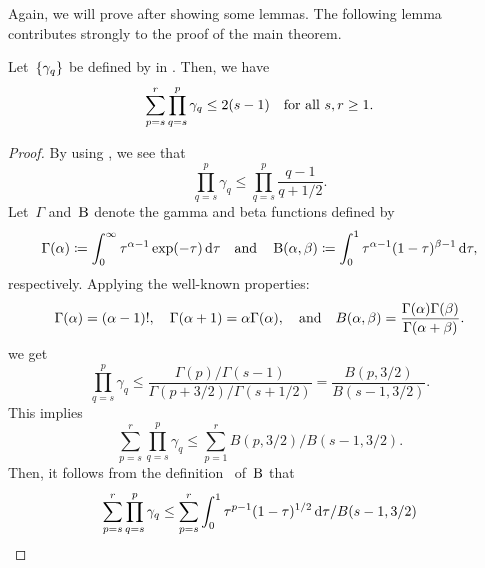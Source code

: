 \documentclass[../main]{subfiles}
\begin{document}
Again, we will prove  after showing some lemmas.
The following lemma contributes strongly to the proof of the main theorem.
\begin{lemma} 
    Let~$\set*{\gamma_q}$ be defined by  in .
    Then, we have
    \begin{equation}
        \sum_{p = s}^r \prod_{q = s}^p \gamma_q \le 2 ( s - 1) \forallcondition{s, r \ge 1}
        .\end{equation}
\end{lemma}
\begin{proof}
    By using , we see that
    \begin{equation}
        \prod_{q = s}^{p} \gamma_q \le \prod_{q = s}^{p} \frac{q - 1}{q + 1 / 2}
        .\end{equation}
    Let~$\Gamma$ and~$\Beta$ denote the gamma and beta functions defined by
    \begin{equation} \label{eq:gamma and beta}
        \Gamma(\alpha) \coloneqq \int_{0}^{\infty} \tau^{\alpha - 1} \exp(-\tau) \odif{\tau} \eqand
        \Beta(\alpha, \beta) \coloneqq \int_{0}^{1} \tau^{\alpha - 1} (1 - \tau)^{\beta - 1} \odif{\tau}
        ,\end{equation}
    respectively.
    Applying the well-known properties:
    \begin{equation} \label{eq:gamma and beta properties}
        \Gamma(\alpha) = (\alpha - 1)!, \quad \Gamma(\alpha + 1) = \alpha \Gamma(\alpha), \eqand B(\alpha, \beta) = \frac{\Gamma(\alpha) \Gamma(\beta)}{\Gamma(\alpha + \beta)}
        .\end{equation}
    we get
    \begin{equation}
        \prod_{q = s}^{p} \gamma_q \le \frac{\Gamma(p) / \Gamma(s - 1)}{\Gamma(p + 3 / 2) / \Gamma(s + 1 / 2)}
        = \frac{B(p, 3 / 2)}{B(s - 1, 3 / 2)}
        .\end{equation}
    This implies
    \begin{equation}
        \sum_{p = s}^{r} \prod_{q = s}^{p} \gamma_q \le \sum_{p = 1}^{r} B(p, 3 / 2) / B(s - 1, 3 / 2)
        .\end{equation}
    Then, it follows from the definition~ of~$\Beta$ that
    \begin{equation}
        \begin{split}
            \sum_{p = s}^{r} \prod_{q = s}^{p} \gamma_q
            &\le \sum_{p = s}^{r} \int_{0}^{1} \tau^{p - 1} (1 - \tau)^{1 / 2} \odif{\tau} / B(s - 1, 3 / 2) \\

\end{split}
\end{equation}
\end{proof}
\end{document}
